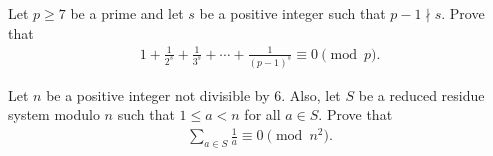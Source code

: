 \documentclass[12pt]{subfile}
\begin{document}
		\begin{problem} %
			Let $p \geq 7$ be a prime and let $s$ be a positive integer such that $p-1 \nmid s$. Prove that 
			\begin{align*}
				1 + \frac {1}{2^s} + \frac {1}{3^s} + \cdots + \frac {1}{(p - 1)^s} \equiv 0 \pmod p.
			\end{align*}
		\end{problem}
		
		\begin{problem} %
			Let $n$ be a positive integer not divisible by $6$. Also, let $S$ be a reduced residue system modulo $n$ such that $1 \leq a <n$ for all $a \in S$. Prove that
			\begin{align*}
			\sum_{a \in S} \frac{1}{a} \equiv 0 \pmod{n^2}.
			\end{align*}
		\end{problem}
	
	
			
\end{document}
